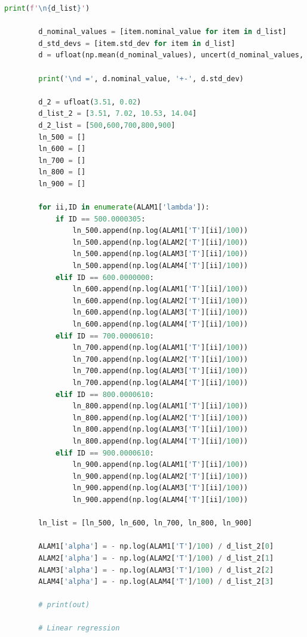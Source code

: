 \documentclass[a4paper,11pt]{article}
\begin{document}
\begin{lstlisting}[language=Python, basicstyle=\tiny, breaklines=true, postbreak=\mbox{\textbackslashspace}]
        print(f'\n{d_list}')

        d_nominal_values = [item.nominal_value for item in d_list]
        d_std_devs = [item.std_dev for item in d_list]
        d = ufloat(np.mean(d_nominal_values), uncert(d_nominal_values, np.mean(d_std_devs)))

        print('\nd =', d.nominal_value, '+-', d.std_dev)

        d_2 = ufloat(3.51, 0.02)
        d_list_2 = [3.51, 7.02, 10.53, 14.04]
        d_2_list = [500,600,700,800,900]
        ln_500 = []
        ln_600 = []
        ln_700 = []
        ln_800 = []
        ln_900 = []

        for ii,ID in enumerate(ALAM1['lambda']):
            if ID == 500.0000305:
                ln_500.append(np.log(ALAM1['T'][ii]/100))
                ln_500.append(np.log(ALAM2['T'][ii]/100))
                ln_500.append(np.log(ALAM3['T'][ii]/100))
                ln_500.append(np.log(ALAM4['T'][ii]/100))
            elif ID == 600.0000000:
                ln_600.append(np.log(ALAM1['T'][ii]/100))
                ln_600.append(np.log(ALAM2['T'][ii]/100))
                ln_600.append(np.log(ALAM3['T'][ii]/100))
                ln_600.append(np.log(ALAM4['T'][ii]/100))
            elif ID == 700.0000610:
                ln_700.append(np.log(ALAM1['T'][ii]/100))
                ln_700.append(np.log(ALAM2['T'][ii]/100))
                ln_700.append(np.log(ALAM3['T'][ii]/100))
                ln_700.append(np.log(ALAM4['T'][ii]/100))
            elif ID == 800.0000610:
                ln_800.append(np.log(ALAM1['T'][ii]/100))
                ln_800.append(np.log(ALAM2['T'][ii]/100))
                ln_800.append(np.log(ALAM3['T'][ii]/100))
                ln_800.append(np.log(ALAM4['T'][ii]/100))
            elif ID == 900.0000610:
                ln_900.append(np.log(ALAM1['T'][ii]/100))
                ln_900.append(np.log(ALAM2['T'][ii]/100))
                ln_900.append(np.log(ALAM3['T'][ii]/100))
                ln_900.append(np.log(ALAM4['T'][ii]/100))

        ln_list = [ln_500, ln_600, ln_700, ln_800, ln_900]

        ALAM1['alpha'] = - np.log(ALAM1['T']/100) / d_list_2[0]
        ALAM2['alpha'] = - np.log(ALAM2['T']/100) / d_list_2[1]
        ALAM3['alpha'] = - np.log(ALAM3['T']/100) / d_list_2[2]
        ALAM4['alpha'] = - np.log(ALAM4['T']/100) / d_list_2[3]

        # print(out)

        # Linear regression


\end{lstlisting}
\end{document}
